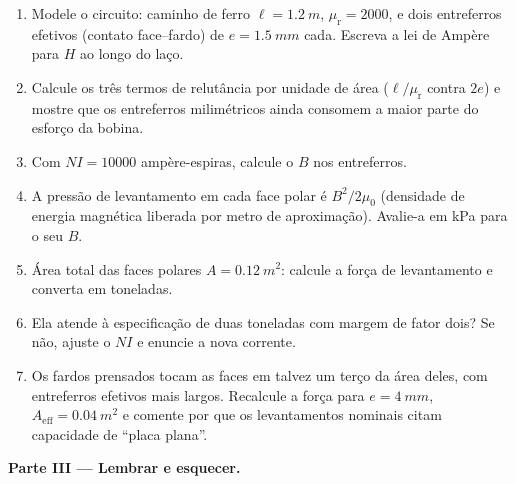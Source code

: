 \begin{problem}
\begin{enumerate}[resume]
  \item Modele o circuito: caminho de ferro $\ell = \qty{1.2}{m}$,
        $\mu_{\text{r}} = 2000$, e dois entreferros efetivos
        (contato face--fardo) de $e = \qty{1.5}{mm}$ cada. Escreva
        a lei de Ampère para $H$ ao longo do laço.
  \item Calcule os três termos de relutância por unidade de área
        ($\ell/\mu_{\text{r}}$ contra $2e$) e mostre que os
        entreferros milimétricos ainda consomem a maior parte do esforço da bobina.
  \item Com $NI = \num{10000}$ ampère-espiras, calcule o $B$ nos
        entreferros.
  \item A pressão de levantamento em cada face polar é $B^2/2\mu_0$
        (densidade de energia magnética liberada por metro de aproximação).
        Avalie-a em \unit{kPa} para o seu $B$.
  \item Área total das faces polares $A = \qty{0.12}{m^2}$: calcule a
        força de levantamento e converta em toneladas.
  \item Ela atende à especificação de duas toneladas com margem de
        fator dois? Se não, ajuste o $NI$ e enuncie a nova corrente.
  \item Os fardos prensados tocam as faces em talvez um terço da
        área deles, com entreferros efetivos mais largos. Recalcule a força para
        $e = \qty{4}{mm}$, $A_{\text{eff}} = \qty{0.04}{m^2}$ e
        comente por que os levantamentos nominais citam capacidade de ``placa plana''.
\end{enumerate}

\medskip\noindent\textbf{Parte III --- Lembrar e esquecer.}


\end{problem}
